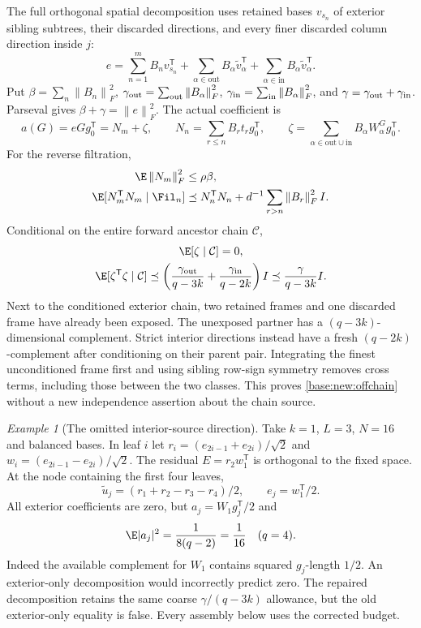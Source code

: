 \documentclass[11pt,oneside,openany,a4paper]{book}
\numberwithin{equation}{chapter}
\theoremstyle{definition}
\theoremstyle{remark}
\newtheorem{example}[theorem]{Example}
\newcommand{\T}{\mathsf T}\newcommand{\Id}{I}
\newcommand{\F}[1]{\left\lVert#1\right\rVert_F}
\begin{document}
The full orthogonal spatial decomposition uses retained bases $v_{s_n}$ of exterior sibling subtrees, their discarded directions, and every finer discarded column direction inside $j$:
\[
 e=\sum_{n=1}^mB_nv_{s_n}^\T
   +\sum_{\alpha\in\mathrm{out}}B_\alpha\widetilde v_\alpha^\T
   +\sum_{\alpha\in\mathrm{in}}B_\alpha\widetilde v_\alpha^\T.
\]
Put $\beta=\sum_n\F{B_n}^2$, $\gamma_{\rm out}=\sum_{\rm out}\F{B_\alpha}^2$, $\gamma_{\rm in}=\sum_{\rm in}\F{B_\alpha}^2$, and $\gamma=\gamma_{\rm out}+\gamma_{\rm in}$. Parseval gives $\beta+\gamma=\F e^2$. The actual coefficient is
\begin{equation}\label{base:new:actualsource}
 a(G)=eGg_0^\T=N_m+\zeta,\qquad
 N_n=\sum_{r\le n}B_rt_rg_0^\T,\qquad
 \zeta=\sum_{\alpha\in\mathrm{out}\cup\mathrm{in}}B_\alpha W_\alpha^Gg_0^\T.
\end{equation}
For the reverse filtration,
\begin{align}
 \E\F{N_m}^2&\le\rho\beta,\label{base:new:source-var}\\
 \E[N_m^\T N_m\mid\Fil_n]&\preceq N_n^\T N_n+
 d^{-1}\sum_{r>n}\F{B_r}^2I.\label{base:new:source-rem}
\end{align}
Conditional on the entire forward ancestor chain $\mathcal C$,
\begin{equation}\label{base:new:offchain}
 \begin{gathered}
 \E[\zeta\mid\mathcal C]=0,\\
 \E[\zeta^\T\zeta\mid\mathcal C]
 \preceq\left(\frac{\gamma_{\rm out}}{q-3k}
       +\frac{\gamma_{\rm in}}{q-2k}\right)I
 \preceq\frac\gamma{q-3k}I.
 \end{gathered}
\end{equation}
Next to the conditioned exterior chain, two retained frames and one discarded frame have already been exposed. The unexposed partner has a $(q-3k)$-dimensional complement. Strict interior directions instead have a fresh $(q-2k)$-complement after conditioning on their parent pair. Integrating the finest unconditioned frame first and using sibling row-sign symmetry removes cross terms, including those between the two classes. This proves \eqref{base:new:offchain} without a new independence assertion about the chain source.

\begin{example}[The omitted interior-source direction]\label{base:con:interior-example}
Take $k=1$, $L=3$, $N=16$ and balanced bases. In leaf $i$ let
$r_i=(e_{2i-1}+e_{2i})/\sqrt2$ and
$w_i=(e_{2i-1}-e_{2i})/\sqrt2$. The residual $E=r_2w_1^\T$ is orthogonal to the fixed space. At the node containing the first four leaves,
\[
 \widetilde u_j=(r_1+r_2-r_3-r_4)/2,
 \qquad e_j=w_1^\T/2.
\]
All exterior coefficients are zero, but
$a_j=W_1g_j^\T/2$ and
\[
 \E|a_j|^2=\frac1{8(q-2)}=\frac1{16}\quad(q=4).
\]
Indeed the available complement for $W_1$ contains squared $g_j$-length $1/2$. An exterior-only decomposition would incorrectly predict zero. The repaired decomposition retains the same coarse $\gamma/(q-3k)$ allowance, but the old exterior-only equality is false. Every assembly below uses the corrected budget.
\end{example}
\end{document}
